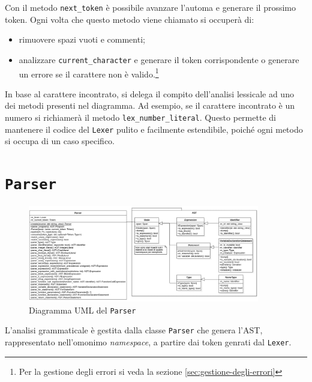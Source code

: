 Con il metodo \texttt{next\_token} \`e possibile avanzare l'automa e generare il prossimo token. Ogni volta che questo metodo viene chiamato si occuper\`a di:
\begin{itemize}
	\item rimuovere spazi vuoti e commenti;
	\item analizzare \texttt{current\_character} e generare il token corrispondente o generare un errore se il carattere non \`e valido.\footnote{Per la gestione degli errori si veda la sezione \ref{sec:gestione-degli-errori}}
\end{itemize}
In base al carattere incontrato, si delega il compito dell'analisi lessicale ad uno dei metodi presenti nel diagramma. Ad esempio, se il carattere incontrato \`e un numero si richiamer\`a il metodo \texttt{lex\_number\_literal}. Questo permette di mantenere il codice del \texttt{Lexer} pulito e facilmente estendibile, poich\'e ogni metodo si occupa di un caso specifico.

\section{\texttt{Parser}}
\label{sec:parser}

\begin{figure}[H]
	\centering
	\includegraphics[width=0.9\textwidth]{figures/parser.png}
	\caption{Diagramma UML del \texttt{Parser}}
	\label{fig:parser-uml}
\end{figure}

L'analisi grammaticale \`e gestita dalla classe \texttt{Parser} che genera l'AST, rappresentato nell'omonimo \textit{namespace}, a partire dai token genrati dal \texttt{Lexer}.

